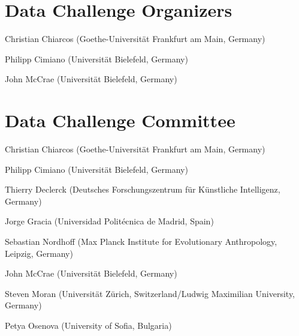 \documentclass[10pt, a4paper]{article}
\begin{document}
\pagebreak
\begin{figure*}[t]
\begin{minipage}{\textwidth}


\section*{Data Challenge Organizers}

\smallskip

Christian Chiarcos (Goethe-Universität Frankfurt am Main, Germany)

Philipp Cimiano (Universität Bielefeld, Germany)

John McCrae (Universität Bielefeld, Germany)

\bigskip

\bigskip

\vspace{2cm}


\section*{Data Challenge Committee}

\smallskip

Christian Chiarcos (Goethe-Universität Frankfurt am Main, Germany)

Philipp Cimiano (Universität Bielefeld, Germany)

Thierry Declerck (Deutsches Forschungszentrum für Künstliche Intelligenz, Germany)

Jorge Gracia (Universidad Politécnica de Madrid, Spain)

Sebastian Nordhoff (Max Planck Institute for Evolutionary Anthropology, Leipzig, Germany)

John McCrae (Universität Bielefeld, Germany)
 
Steven Moran (Universität Zürich, Switzerland/Ludwig Maximilian University, Germany)
 
Petya Osenova (University of Sofia, Bulgaria)
 
\vspace{11cm}
 
\end{minipage}
\end{figure*}
\end{document}
